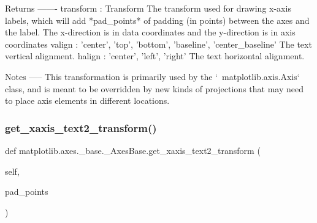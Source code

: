 \begin{DoxyVerb}Returns
-------
transform : Transform
    The transform used for drawing x-axis labels, which will add
    *pad_points* of padding (in points) between the axes and the label.
    The x-direction is in data coordinates and the y-direction is in
    axis coordinates
valign : {'center', 'top', 'bottom', 'baseline', 'center_baseline'}
    The text vertical alignment.
halign : {'center', 'left', 'right'}
    The text horizontal alignment.

Notes
-----
This transformation is primarily used by the `~matplotlib.axis.Axis`
class, and is meant to be overridden by new kinds of projections that
may need to place axis elements in different locations.
\end{DoxyVerb}
 \mbox{\label{classmatplotlib_1_1axes_1_1__base_1_1__AxesBase_ab448c435366234278b7d7b37ea1c2265}} 
\subsubsection{\texorpdfstring{get\+\_\+xaxis\+\_\+text2\+\_\+transform()}{get\_xaxis\_text2\_transform()}}
{\footnotesize\ttfamily def matplotlib.\+axes.\+\_\+base.\+\_\+\+Axes\+Base.\+get\+\_\+xaxis\+\_\+text2\+\_\+transform (\begin{DoxyParamCaption}\item[{}]{self,  }\item[{}]{pad\+\_\+points }\end{DoxyParamCaption})}


